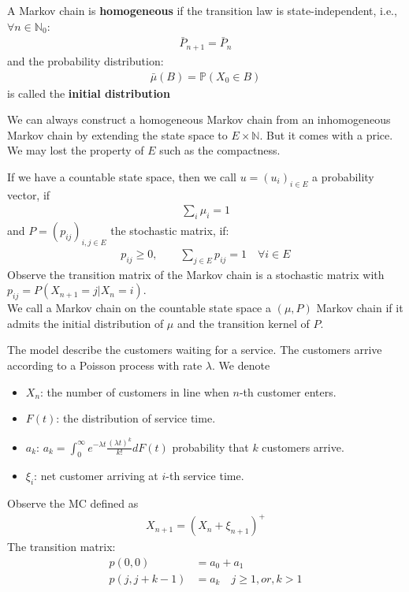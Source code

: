  \begin{definition}
 	A Markov chain is \textbf{homogeneous }if the transition law is state-independent, i.e., $\forall n \in \mathbb{N}_0$:
 	\begin{align*}
 		\bar{P}_{n+1} = \bar{P}_n
 	\end{align*}
 	and the probability distribution:
 	\begin{align*}
 		\bar{\mu}(B) =  \mathbb{P}(X_0 \in B)
 	\end{align*}
 	is called the \textbf{initial distribution}
 \end{definition}
 
\begin{remark}[homogeneosity]
 We can always construct a homogeneous Markov chain from an inhomogeneous Markov chain by extending the state space to $E \times \mathbb{N}$. But it comes with a price.	 We may lost the property of $E$ such as the compactness.
\end{remark}

\begin{remark}
If we have a countable state space, then we call $u = (u_i)_{i \in E}$ a probability vector, if
 \begin{align*}
 	\sum_i \mu_i = 1
 \end{align*}
 and $P = (p_{ij})_{i, j \in E}$ the stochastic matrix, if:
 \begin{align*}
 	p_{ij} \geq 0, \qquad \sum_{j \in E} p_{ij} = 1 \quad \forall i \in E
 \end{align*}
 Observe the transition matrix of the Markov chain is a stochastic matrix with $p_{ij} = P(X_{n + 1} = j|X_n = i)$.\\
 We call a Markov chain on the countable state space a $(\mu, P)$ Markov chain if it admits the initial distribution of $\mu$ and the transition kernel  of $P$.
\end{remark}

\begin{example}[M/G/1 queue]
The model describe the customers waiting for a service. The customers arrive according to a Poisson process with rate $\lambda$. We denote
\begin{itemize}
	\item $X_n$: the number of customers in line when $n$-th customer enters.
	\item $F(t)$: the distribution of service time.
	\item $a_k$: $a_k = \int_0^\infty e^{-\lambda t} \frac{(\lambda t)^k}{k!} dF(t)$ probability that $k$ customers arrive.
	\item $\xi_i$: net customer arriving at $i$-th service time.
\end{itemize}
Observe the MC defined as
\begin{align*}
	X_{n+1} = (X_n + \xi_{n+1})^+
\end{align*}
The transition matrix:
\begin{align*}
	p(0, 0) &= a_0 + a_1\\
	p(j, j + k - 1) &= a_k \quad j \ge 1, or, k > 1
\end{align*}
\end{example}


